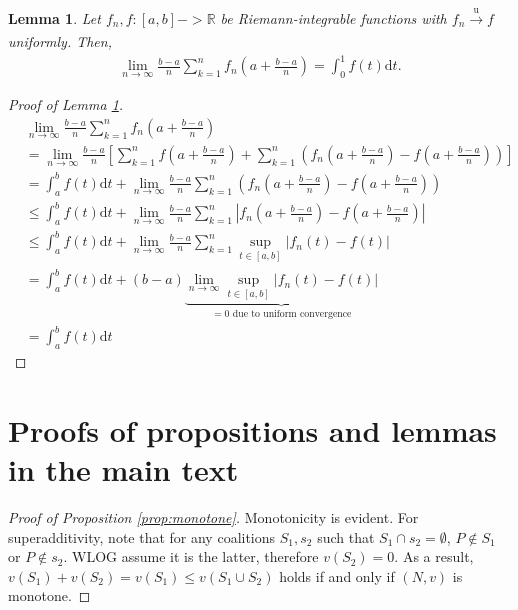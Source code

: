 \documentclass[a4paper]{article}
\newtheorem{lemma}{Lemma}
\newcommand{\dt}{\mathrm{d}t}
\begin{document}
\begin{lemma}
    \label{lemma:integral_convergence}
    Let $f_n, f: [a, b] -> \mathbb{R}$ be Riemann-integrable functions with $f_n \xrightarrow[]{\mathrm{u}} f$ uniformly. Then,
    \begin{align*}
        \lim_{n \to \infty} \frac{b-a}{n} \sum_{k=1}^n f_n \left( a + \frac{b-a}{n} \right) = \int_0^1 f(t) \dt.
    \end{align*}
\end{lemma}
\begin{proof}[Proof of Lemma \ref{lemma:integral_convergence}]
    \begin{align*}
        &\lim_{n \to \infty} \frac{b-a}{n} \sum_{k=1}^n f_n \left( a + \frac{b-a}{n} \right) \\
        &= \lim_{n \to \infty} \frac{b-a}{n} \left[ \sum_{k=1}^n f \left( a + \frac{b-a}{n} \right) + \sum_{k=1}^n \left( f_n \left( a + \frac{b-a}{n} \right) - f \left( a + \frac{b-a}{n} \right) \right) \right] \\
        &= \int_a^b f(t) \dt + \lim_{n \to \infty} \frac{b-a}{n}\sum_{k=1}^n \left( f_n \left( a + \frac{b-a}{n} \right) - f \left( a + \frac{b-a}{n} \right) \right) \\
        &\leq \int_a^b f(t) \dt + \lim_{n \to \infty} \frac{b-a}{n}\sum_{k=1}^n \left| f_n \left( a + \frac{b-a}{n} \right) - f \left( a + \frac{b-a}{n} \right) \right| \\
        &\leq \int_a^b f(t) \dt + \lim_{n \to \infty} \frac{b-a}{n}\sum_{k=1}^n \sup_{t \in [a, b]} \left| f_n(t) - f(t) \right| \\
        &= \int_a^b f(t) \dt + (b-a) \underbrace{\lim_{n \to \infty} \sup_{t \in [a, b]} \left| f_n(t) - f(t) \right|}_{=0 \text{ due to uniform convergence}} \\
        &= \int_a^b f(t) \dt
    \end{align*}
\end{proof}


\section{Proofs of propositions and lemmas in the main text}

\begin{proof}[Proof of Proposition \ref{prop:monotone}]
    Monotonicity is evident. For superadditivity, note that for any coalitions $S_1, s_2$ such that $S_1 \cap s_2 = \emptyset$, $P \notin S_1$ or $P \notin s_2$. WLOG assume it is the latter, therefore $v(S_2) = 0$. As a result, $v(S_1) + v(S_2) = v(S_1) \leq v(S_1 \cup S_2)$ holds if and only if $(N, v)$ is monotone.
\end{proof}
\end{document}
